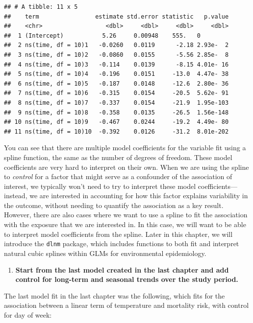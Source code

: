 \documentclass[
]{book}
\providecommand{\tightlist}{%
  \setlength{\itemsep}{0pt}\setlength{\parskip}{0pt}}
\begin{document}
\begin{verbatim}
## # A tibble: 11 x 5
##    term                estimate std.error statistic   p.value
##    <chr>                  <dbl>     <dbl>     <dbl>     <dbl>
##  1 (Intercept)           5.26     0.00948    555.   0        
##  2 ns(time, df = 10)1   -0.0260   0.0119      -2.18 2.93e-  2
##  3 ns(time, df = 10)2   -0.0860   0.0155      -5.56 2.85e-  8
##  4 ns(time, df = 10)3   -0.114    0.0139      -8.15 4.01e- 16
##  5 ns(time, df = 10)4   -0.196    0.0151     -13.0  4.47e- 38
##  6 ns(time, df = 10)5   -0.187    0.0148     -12.6  2.80e- 36
##  7 ns(time, df = 10)6   -0.315    0.0154     -20.5  5.62e- 91
##  8 ns(time, df = 10)7   -0.337    0.0154     -21.9  1.95e-103
##  9 ns(time, df = 10)8   -0.358    0.0135     -26.5  1.56e-148
## 10 ns(time, df = 10)9   -0.467    0.0244     -19.2  4.49e- 80
## 11 ns(time, df = 10)10  -0.392    0.0126     -31.2  8.01e-202
\end{verbatim}

You can see that there are multiple model coefficients for the variable fit
using a spline function, the same as the number of degrees of freedom. These
model coefficients are very hard to interpret on their own. When we are using
the spline to \emph{control} for a factor that might serve as a confounder of the
association of interest, we typically won't need to try to interpret these
model coefficients---instead, we are interested in accounting for how this
factor explains variability in the outcome, without needing to quantify the
association as a key result. However, there are also cases where we want to
use a spline to fit the association with the exposure that we are interested
in. In this case, we will want to be able to interpret model coefficients from
the spline. Later in this chapter, we will introduce the \texttt{dlnm} package, which
includes functions to both fit and interpret natural cubic splines within
GLMs for environmental epidemiology.

\begin{enumerate}
\def\labelenumi{\arabic{enumi}.}
\setcounter{enumi}{1}
\tightlist
\item
  \textbf{Start from the last model created in the last chapter and add control for
  long-term and seasonal trends over the study period.}
\end{enumerate}

The last model fit in the last chapter was the following, which fits for the
association between a linear term of temperature and mortality risk, with control
for day of week:
\end{document}
